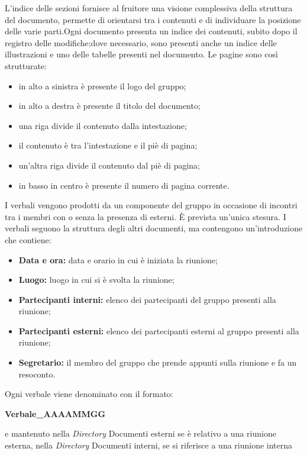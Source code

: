             L’indice delle sezioni fornisce al fruitore una visione complessiva della struttura del documento, permette di orientarsi tra i contenuti e di individuare la posizione delle varie parti.Ogni documento presenta un indice dei contenuti, subito dopo il registro delle modifiche;dove necessario, sono presenti anche un indice delle illustrazioni e uno delle tabelle presenti nel documento.
            Le pagine sono così strutturate:
            \begin{itemize}
                \item in alto a sinistra è presente il logo del gruppo;
                \item in alto a destra è presente il titolo del documento;
                \item una riga divide il contenuto dalla intestazione;
                \item il contenuto è tra l'intestazione e il piè di pagina;
                \item un'altra riga divide il contenuto dal piè di pagina;
                \item in basso in centro è presente il numero di pagina corrente.
            \end{itemize}
            I verbali vengono prodotti da un componente del gruppo in occasione di incontri tra i membri con o senza la presenza di esterni. È prevista un'unica stesura. I verbali seguono la struttura degli altri documenti, ma contengono un'introduzione che contiene:
            \begin{itemize}
                \item \textbf{Data e ora:} data e orario in cui è iniziata la riunione;
                \item \textbf{Luogo:} luogo in cui si è svolta la riunione;
                \item \textbf{Partecipanti interni:} elenco dei partecipanti del gruppo presenti alla riunione;
                \item \textbf{Partecipanti esterni:} elenco dei partecipanti esterni al gruppo presenti alla riunione; 
                \item \textbf{Segretario:} il membro del gruppo che prende appunti sulla riunione e fa un resoconto.
            \end{itemize}
            Ogni verbale viene denominato con il formato:
            \begin{center}
                \textbf{Verbale\_AAAAMMGG} \\
            \end{center}
            e mantenuto nella \textit{Directory} Documenti esterni se è relativo a una riunione esterna, nella \textit{Directory} Documenti interni, se si riferisce a una riunione interna
